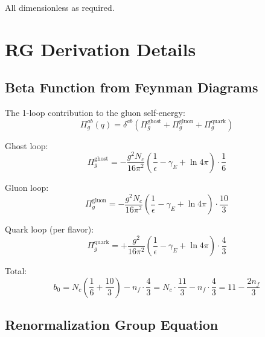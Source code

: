 \documentclass[11pt,a4paper]{article}
\theoremstyle{definition}
\begin{document}
All dimensionless as required.

\appendix
\section{RG Derivation Details}
\label{app:rg-details}

\subsection{Beta Function from Feynman Diagrams}
\label{subsec:beta-feynman}

The 1-loop contribution to the gluon self-energy:
\begin{equation}
\label{eq:gluon-self}
\Pi_g^{ab}(q) = \delta^{ab}\left(\Pi_g^{\text{ghost}} + \Pi_g^{\text{gluon}} + \Pi_g^{\text{quark}}\right)
\end{equation}

Ghost loop:
\begin{equation}
\label{eq:ghost-loop}
\Pi_g^{\text{ghost}} = -\frac{g^2 N_c}{16\pi^2}\left(\frac{1}{\epsilon} - \gamma_E + \ln 4\pi\right)
  \cdot \frac{1}{6}
\end{equation}

Gluon loop:
\begin{equation}
\label{eq:gluon-loop}
\Pi_g^{\text{gluon}} = -\frac{g^2 N_c}{16\pi^2}\left(\frac{1}{\epsilon} - \gamma_E + \ln 4\pi\right)
  \cdot \frac{10}{3}
\end{equation}

Quark loop (per flavor):
\begin{equation}
\label{eq:quark-loop}
\Pi_g^{\text{quark}} = +\frac{g^2}{16\pi^2}\left(\frac{1}{\epsilon} - \gamma_E + \ln 4\pi\right)
  \cdot \frac{4}{3}
\end{equation}

Total:
\begin{equation}
\label{eq:total-beta}
b_0 = N_c\left(\frac{1}{6} + \frac{10}{3}\right) - n_f \cdot \frac{4}{3}
  = N_c \cdot \frac{11}{3} - n_f \cdot \frac{4}{3}
  = 11 - \frac{2n_f}{3}
\end{equation}

\subsection{Renormalization Group Equation}
\label{subsec:rge}
\end{document}
